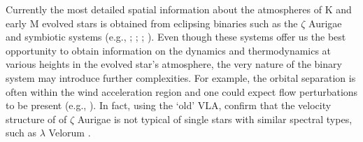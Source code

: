 \documentclass[iop]{emulateapj}
\begin{document}
Currently the most detailed spatial information about the atmospheres of K and early M evolved stars is obtained from eclipsing binaries such as the $\zeta$ Aurigae and symbiotic systems (e.g., \citealt{1970VA.....12..147W}; \citealt{1996ApJ...466..979B}; \citealt{2008AJ....136.1964E}; \citealt{2008ApJ...675..711C}). Even though these systems offer us the best opportunity to obtain information on the dynamics and thermodynamics at various heights in the evolved star's atmosphere, the very nature of the binary system may introduce further complexities. For example, the orbital separation is often within the wind acceleration region and one could expect flow perturbations to be present (e.g., \citealt{1981ApJ...248.1043C}). In fact, using the `old' VLA, \cite{2005AJ....129.1018H} confirm that the velocity structure of  of $\zeta$ Aurigae is not typical of single stars with similar spectral types, such as $\lambda$ Velorum \citep{1999ApJ...521..382C}. 
\end{document}
